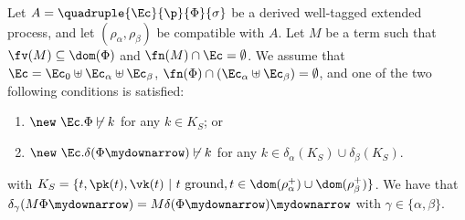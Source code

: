 \begin{lemma}
\label{lem:samerecipesymmetric}
Let $A = \quadruple{\Ec}{\p}{\Phi}{\sigma}$ be a derived well-tagged extended process, and let $(\rho_\alpha, \rho_\beta)$ be compatible with $A$.
Let  $M$ be a term such that $\fv(M) \subseteq \dom(\Phi)$ and $\fn(M) \cap \Ec =
\emptyset$. We assume that 
$\Ec =  \Ec_0 \uplus \Ec_\alpha
\uplus \Ec_\beta$, 
 $\fn(\Phi) \cap (\Ec_\alpha \uplus \Ec_\beta) = \emptyset$, and
one of the two following conditions
is satisfied: 
\begin{enumerate}
\item  $\new\ \Ec. \Phi \not\vdash k$ for any $k \in K_S$; or
\item  $\new\ \Ec. \delta(\Phi\mydownarrow) \not\vdash k$ for any {$k \in \delta_\alpha(K_S) \cup \delta_\beta(K_S)$.} 
\end{enumerate}
with $K_S = \{t, \pk(t),\vk(t) ~|~  \mbox{$t$ ground}, t \in \dom(\rho^+_\alpha) \cup
\dom(\rho^+_\beta)\}$. 
We have that $\delta_\gamma(M\Phi\mydownarrow) =
M\delta(\Phi\mydownarrow)\mydownarrow$ with $\gamma \in \{\alpha,\beta\}$.
\end{lemma}

